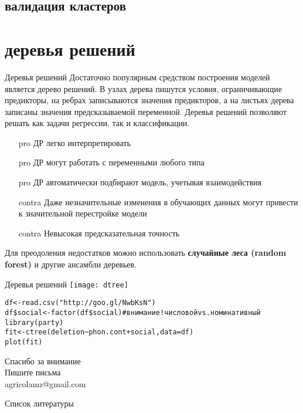 \subsection{валидация кластеров}
\section{деревья решений}
\begin{frame}{Деревья решений}
Достаточно популярным средством построения моделей является дерево решений. В узлах дерева пишутся условия, ограничивающие предикторы, на ребрах записываются значения предикторов, а на листьях дерева записаны значения предсказываемой переменной. Деревья решений позволяют решать как задачи регрессии, так и классификации.
\vspace{-3mm}
\begin{multicols}{2}
\begin{itemize}
\item[pro]  ДР легко интерпретировать
\item[pro] ДР могут работать с переменными любого типа
\item[pro] ДР автоматически подбирают модель, учетывая взаимодействия
\columnbreak
\item[contra] Даже незначительные изменения в обучающих данных могут привести к значительной перестройке модели
\item[contra] Невысокая предсказательная точность
\end{itemize}
\end{multicols}
Для преодоления недостатков можно использовать \textbf{случайные леса (random forest)} и другие ансамбли деревьев.
\end{frame}
\begin{frame}{Деревья решений}
\texttt{[image: dtree]}\\
\scriptsize
\begin{alltt}
df <- read.csv("http://goo.gl/NwbKsN") \\
df\$social <- \alert{factor(df\$social) \hfill \# внимание! числовой vs. номинативный}\medskip\\
\alert{library(party)} \\
fit <- \alert{ctree(}deletion\textasciitilde phon.cont+social, data=df\alert{)}\\
plot(fit)
\end{alltt}
\normalsize
\end{frame}
\begin{frame}
{\huge Спасибо за внимание\bigskip\\
\normalsize Пишите письма\\
agricolamz@gmail.com
\vspace{-130pt}}
\end{frame}
\begin{frame}{Список литературы}
\footnotesize


\end{frame}
